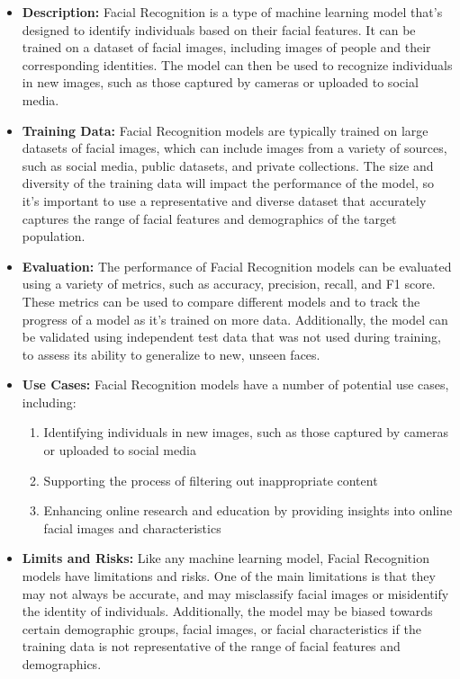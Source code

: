 \begin{itemize}
    \item \textbf{Description:} Facial Recognition is a type of machine learning model that's designed to identify individuals based on their facial features. It can be trained on a dataset of facial images, including images of people and their corresponding identities. The model can then be used to recognize individuals in new images, such as those captured by cameras or uploaded to social media.
    \item \textbf{Training Data:} Facial Recognition models are typically trained on large datasets of facial images, which can include images from a variety of sources, such as social media, public datasets, and private collections. The size and diversity of the training data will impact the performance of the model, so it's important to use a representative and diverse dataset that accurately captures the range of facial features and demographics of the target population.
    \item \textbf{Evaluation:} The performance of Facial Recognition models can be evaluated using a variety of metrics, such as accuracy, precision, recall, and F1 score. These metrics can be used to compare different models and to track the progress of a model as it's trained on more data. Additionally, the model can be validated using independent test data that was not used during training, to assess its ability to generalize to new, unseen faces.
    \item \textbf{Use Cases:} Facial Recognition models have a number of potential use cases, including:
        \begin{enumerate}  
            \item Identifying individuals in new images, such as those captured by cameras or uploaded to social media
            \item Supporting the process of filtering out inappropriate content
            \item Enhancing online research and education by providing insights into online facial images and characteristics
        \end{enumerate}
    \item \textbf{Limits and Risks:} Like any machine learning model, Facial Recognition models have limitations and risks. One of the main limitations is that they may not always be accurate, and may misclassify facial images or misidentify the identity of individuals. Additionally, the model may be biased towards certain demographic groups, facial images, or facial characteristics if the training data is not representative of the range of facial features and demographics.

\end{itemize}
